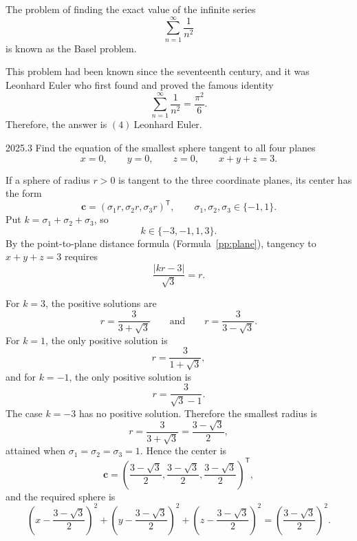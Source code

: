     \begin{solution}
        The problem of finding the exact value of the infinite series
        \[
            \sum_{n=1}^{\infty}\frac{1}{n^2}
        \]
        is known as the Basel problem.

        This problem had been known since the seventeenth century, and it was Leonhard Euler who
        first found and proved the famous identity
        \[
            \sum_{n=1}^{\infty}\frac{1}{n^2}
            =
            \frac{\pi^2}{6}.
        \]
        Therefore, the answer is $\boxed{(4)\ \text{Leonhard Euler}}$.
    \end{solution}

    \begin{pastproblem}{2025.3}
        Find the equation of the smallest sphere tangent to all four planes
        \[
            x=0,\qquad y=0,\qquad z=0,\qquad x+y+z=3.
        \]
    \end{pastproblem}

    \begin{solution}
        If a sphere of radius $r>0$ is tangent to the three coordinate planes,
        its center has the form
        \[
            \mathbf{c}=(\sigma_1r,\sigma_2r,\sigma_3r)^{\mathsf T},
            \qquad
            \sigma_1,\sigma_2,\sigma_3\in\{-1,1\}.
        \]
        Put $k=\sigma_1+\sigma_2+\sigma_3$, so
        \[
            k\in\{-3,-1,1,3\}.
        \]
        By the point-to-plane distance formula (Formula~\ref{pp:plane}), tangency to $x+y+z=3$ requires
        \[
            \frac{|kr-3|}{\sqrt3}=r.
        \]

        For $k=3$, the positive solutions are
        \[
            r=\frac{3}{3+\sqrt3}
            \qquad\text{and}\qquad
            r=\frac{3}{3-\sqrt3}.
        \]
        For $k=1$, the only positive solution is
        \[
            r=\frac{3}{1+\sqrt3},
        \]
        and for $k=-1$, the only positive solution is
        \[
            r=\frac{3}{\sqrt3-1}.
        \]
        The case $k=-3$ has no positive solution. Therefore the smallest
        radius is
        \[
            r=\frac{3}{3+\sqrt3}
            =\frac{3-\sqrt3}{2},
        \]
        attained when $\sigma_1=\sigma_2=\sigma_3=1$. Hence the center is
        \[
            \mathbf{c}
            =
            \left(
                \frac{3-\sqrt3}{2},
                \frac{3-\sqrt3}{2},
                \frac{3-\sqrt3}{2}
            \right)^{\mathsf T},
        \]
        and the required sphere is
        \[
            \boxed{
            \left(x-\frac{3-\sqrt3}{2}\right)^2
            +
            \left(y-\frac{3-\sqrt3}{2}\right)^2
            +
            \left(z-\frac{3-\sqrt3}{2}\right)^2
            =
            \left(\frac{3-\sqrt3}{2}\right)^2
            }.
        \]
    \end{solution}

